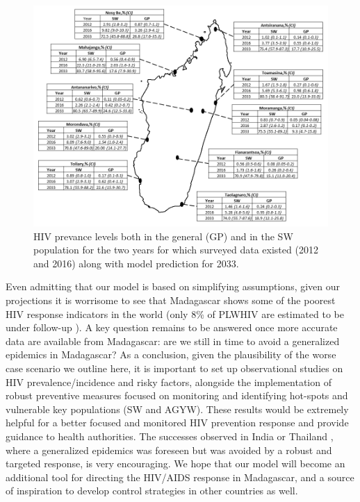 \documentclass[preprint,12pt]{elsarticle}
\begin{document}
\begin{figure}
\centering\includegraphics[width=1.0\linewidth,angle=0]{Figure 1_modelling.png}
\caption{HIV prevance levels both in the general (GP) and in the SW population for the two years for which surveyed data existed (2012 and 2016) along with model prediction for 2033.}
\label{Fig:Map}
\end{figure}

Even admitting that our model is based on simplifying assumptions, given our projections it is worrisome to see that Madagascar shows some of the poorest HIV response indicators in the world (only 8\% of PLWHIV are estimated to be under follow-up \cite{UNAIDS2019}). A key question remains to be answered once more accurate data are available from Madagascar: are we still in time to avoid a generalized epidemics in Madagascar? As a conclusion, given the plausibility of the worse case scenario we outline here, it is important to set up observational studies on HIV prevalence/incidence and risky factors, alongside the implementation of robust preventive measures focused on monitoring and identifying hot-spots and vulnerable key populations (SW and AGYW). These results would be extremely helpful for a better focused and monitored HIV prevention response and provide guidance to health authorities. The successes observed in India or Thailand \cite{IndiaReport2016,Celentano1998}, where a generalized epidemics was foreseen but was avoided by a robust and targeted response, is very encouraging. We hope that our model will become an additional tool for directing the HIV/AIDS response in Madagascar, and a source of inspiration to develop control strategies in other countries as well. 
\end{document}
